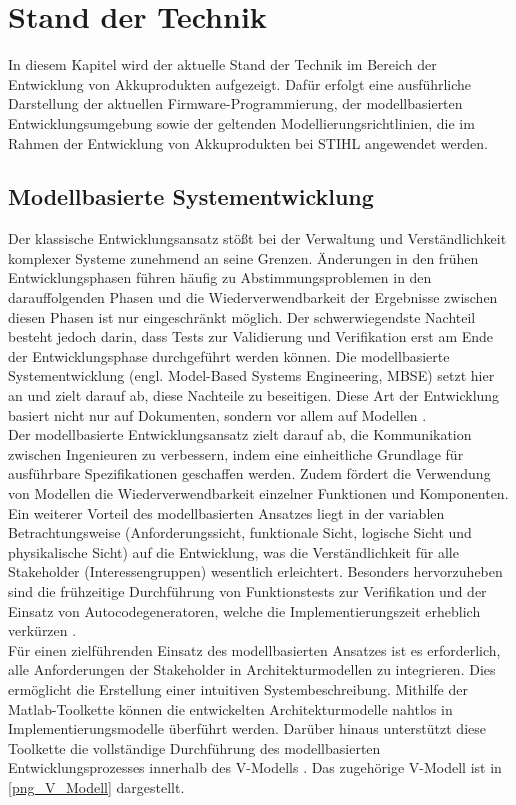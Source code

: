 \chapter{Stand der Technik}
\label{ch_stand_der_technik}
In diesem Kapitel wird der aktuelle Stand der Technik im Bereich der Entwicklung von Akkuprodukten aufgezeigt. Dafür erfolgt eine ausführliche Darstellung der aktuellen Firmware-Programmierung, der modellbasierten Entwicklungsumgebung sowie der geltenden Modellierungsrichtlinien, die im Rahmen der Entwicklung von Akkuprodukten bei STIHL angewendet werden.
\section{Modellbasierte Systementwicklung}
\label{sec_modbas}
Der klassische Entwicklungsansatz stößt bei der Verwaltung und Verständlichkeit komplexer Systeme zunehmend an seine Grenzen. Änderungen in den frühen Entwicklungsphasen führen häufig zu Abstimmungsproblemen in den darauffolgenden Phasen und die Wiederverwendbarkeit der Ergebnisse zwischen diesen Phasen ist nur eingeschränkt möglich. Der schwerwiegendste Nachteil besteht jedoch darin, dass Tests zur Validierung und Verifikation erst am Ende der Entwicklungsphase durchgeführt werden können. Die modellbasierte Systementwicklung (engl. Model-Based Systems Engineering, MBSE) setzt hier an und zielt darauf ab, diese Nachteile zu beseitigen. Diese Art der Entwicklung basiert nicht nur auf Dokumenten, sondern vor allem auf Modellen \cite{Skript_Baur_Modbas}.\\
Der modellbasierte Entwicklungsansatz zielt darauf ab, die Kommunikation zwischen Ingenieuren zu verbessern, indem eine einheitliche Grundlage für ausführbare Spezifikationen geschaffen werden. Zudem fördert die Verwendung von Modellen die Wiederverwendbarkeit einzelner Funktionen und Komponenten. Ein weiterer Vorteil des modellbasierten Ansatzes liegt in der variablen Betrachtungsweise (Anforderungssicht, funktionale Sicht, logische Sicht und physikalische Sicht) auf die Entwicklung, was die Verständlichkeit für alle Stakeholder (Interessengruppen) wesentlich erleichtert. Besonders hervorzuheben sind die frühzeitige Durchführung von Funktionstests zur Verifikation und der Einsatz von Autocodegeneratoren, welche die Implementierungszeit erheblich verkürzen \cite{Skript_Baur_Modbas}.\\
Für einen zielführenden Einsatz des modellbasierten Ansatzes ist es erforderlich, alle Anforderungen der Stakeholder in Architekturmodellen zu integrieren. Dies ermöglicht die Erstellung einer intuitiven Systembeschreibung. Mithilfe der Matlab-Toolkette können die entwickelten Architekturmodelle nahtlos in Implementierungsmodelle überführt werden. Darüber hinaus unterstützt diese Toolkette die vollständige Durchführung des modellbasierten Entwicklungsprozesses innerhalb des V-Modells \cite{Skript_Baur_Modbas}. Das zugehörige V-Modell ist in \autoref{png_V_Modell} dargestellt.

